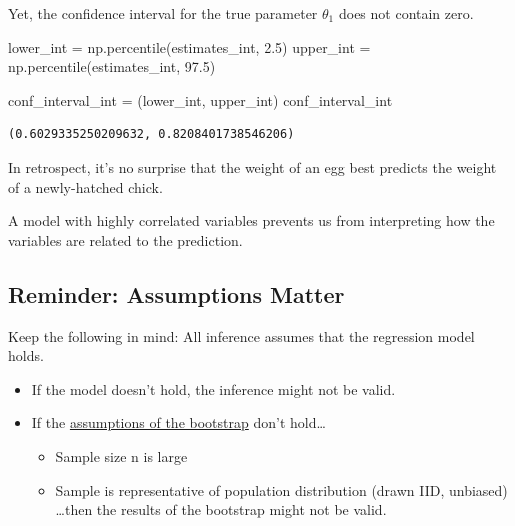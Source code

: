 \documentclass[
  letterpaper,
  DIV=11,
  numbers=noendperiod]{scrreprt}
\newenvironment{Shaded}{\begin{snugshade}}{\end{snugshade}}
\newcommand{\FloatTok}[1]{\textcolor[rgb]{0.68,0.00,0.00}{#1}}
\newcommand{\NormalTok}[1]{\textcolor[rgb]{0.00,0.23,0.31}{#1}}
\newcommand{\OperatorTok}[1]{\textcolor[rgb]{0.37,0.37,0.37}{#1}}
\providecommand{\tightlist}{%
  \setlength{\itemsep}{0pt}\setlength{\parskip}{0pt}}\usepackage{longtable,booktabs,array}
\begin{document}
Yet, the confidence interval for the true parameter \(\theta_{1}\) does
not contain zero.

\begin{Shaded}
\begin{Highlighting}[]
\NormalTok{lower\_int }\OperatorTok{=}\NormalTok{ np.percentile(estimates\_int, }\FloatTok{2.5}\NormalTok{)}
\NormalTok{upper\_int }\OperatorTok{=}\NormalTok{ np.percentile(estimates\_int, }\FloatTok{97.5}\NormalTok{)}

\NormalTok{conf\_interval\_int }\OperatorTok{=}\NormalTok{ (lower\_int, upper\_int)}
\NormalTok{conf\_interval\_int}
\end{Highlighting}
\end{Shaded}

\begin{verbatim}
(0.6029335250209632, 0.8208401738546206)
\end{verbatim}

In retrospect, it's no surprise that the weight of an egg best predicts
the weight of a newly-hatched chick.

A model with highly correlated variables prevents us from interpreting
how the variables are related to the prediction.

\hypertarget{reminder-assumptions-matter}{%
\subsection{Reminder: Assumptions
Matter}\label{reminder-assumptions-matter}}

Keep the following in mind: All inference assumes that the regression
model holds.

\begin{itemize}
\tightlist
\item
  If the model doesn't hold, the inference might not be valid.
\item
  If the
  \href{https://inferentialthinking.com/chapters/13/3/Confidence_Intervals.html?highlight=p\%20value\%20confidence\%20interval\#care-in-using-the-bootstrap-percentile-method}{assumptions
  of the bootstrap} don't hold\ldots{}

  \begin{itemize}
  \tightlist
  \item
    Sample size n is large
  \item
    Sample is representative of population distribution (drawn IID,
    unbiased) \ldots then the results of the bootstrap might not be
    valid.
  \end{itemize}
\end{itemize}
\end{document}
